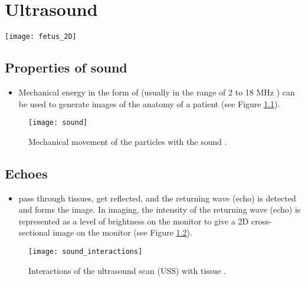 \chapter{Ultrasound}
\vspace{-40ex}\hspace{35ex}
\texttt{[image: fetus\_2D]}

\section{Properties of sound}

\begin{itemize}
\item Mechanical energy in the form of  (usually in the range of 2 to 18 MHz
  \cite{abdulla2025sound})  can be
  used to generate images of the anatomy of a patient (see Figure
  \ref{fig:sound}).
\end{itemize}
\vspace{-2ex}
\begin{figure}[!h]
  \centering
  \texttt{[image: sound]}
  \caption{Mechanical movement of the particles with the sound
    \cite{abdulla2025properties_sound}.\label{fig:sound}}
\end{figure}

\section{Echoes}
\begin{itemize}
\item {} pass
  through tissues, get reflected, and the returning wave (echo) is
  detected and forms the
  image\cite{bushberg2011essential,abdulla2025ultrasound_machine}. In
  imaging, the intensity of the returning wave (echo) is represented
  as a level of brightness on the monitor to give a 2D cross-sectional
  image on the monitor \cite{abdulla2025ultrasound} (see Figure
  \ref{fig:interactions}).
\end{itemize}
\vspace{-3ex}
\begin{figure}[!h]
  \centering
  \texttt{[image: sound\_interactions]}
  \caption{Interactions of the ultrasound scan (USS) with tissue
    \cite{abdulla2025properties_sound}.\label{fig:interactions}}
\end{figure}


